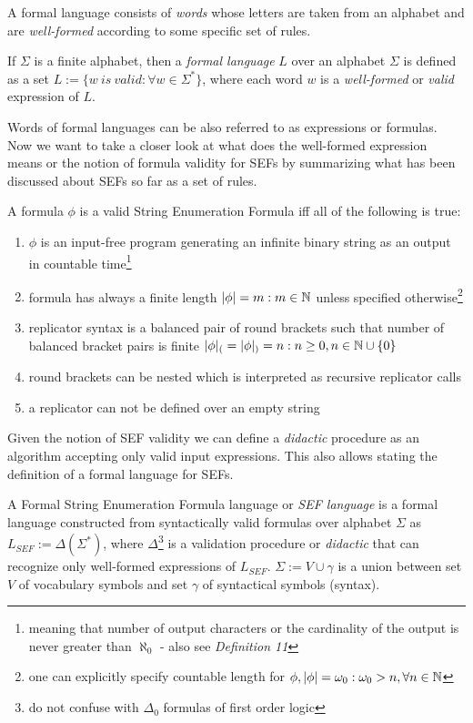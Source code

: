 A formal language consists of \textit{words} whose letters are taken from an alphabet and are \textit{well-formed} according to some specific set of rules.

\begin{definition}
  If $\Sigma$ is a finite alphabet, then a \textit{formal language} $L$ over an alphabet $\Sigma$ is defined as a set $L := \{ w\ is\ valid : \forall w \in \Sigma^* \}$, where each word $w$ is a \textit{well-formed} or \textit{valid} expression of $L$.
\end{definition}

Words of formal languages can be also referred to as expressions or formulas. Now we want to take a closer look at what does the {well-formed expression} means or the notion of formula validity for SEFs by summarizing what has been discussed about SEFs so far as a set of rules.

\begin{definition}
  A formula $\phi$ is a valid String Enumeration Formula iff all of the following is true:

  \begin{enumerate}
    \item $\phi$ is an input-free program generating an infinite binary string as an output in countable time\footnote{meaning that number of output characters or the cardinality of the output is never greater than $\aleph_0$ - also see \textit{Definition 11}}
    \item formula has always a finite length $|\phi| = m: m \in \mathbb{N}$ unless specified otherwise\footnote{one can explicitly specify countable length for $\phi, |\phi| = \omega_0: \omega_0 > n, \forall n \in \mathbb{N}$}
    \item replicator syntax is a balanced pair of round brackets such that number of balanced bracket pairs is finite $|\phi|_{(} = |\phi|_{)} = n: n \geq 0, n \in \mathbb{N} \cup \{0\}$
    \item round brackets can be nested which is interpreted as recursive replicator calls
    \item a replicator can not be defined over an empty string
  \end{enumerate}
\end{definition}

Given the notion of SEF validity we can define a \textit{didactic} procedure as an algorithm accepting only valid input expressions. This also allows stating the definition of a formal language for SEFs.

\begin{definition}A Formal String Enumeration Formula language or \textit{SEF language} is a formal language constructed from syntactically valid formulas over alphabet $\Sigma$ as $L_{SEF} := \Delta(\Sigma^*)$, where $\Delta$\footnote{do not confuse with $\Delta_0$ formulas\cite{jech2003set} of first order logic} is a validation procedure or \textit{didactic} that can recognize only well-formed expressions of $L_{SEF}$. $\Sigma := V \cup \gamma$ is a union between set $V$ of vocabulary symbols and set $\gamma$ of syntactical symbols (syntax).\end{definition}

